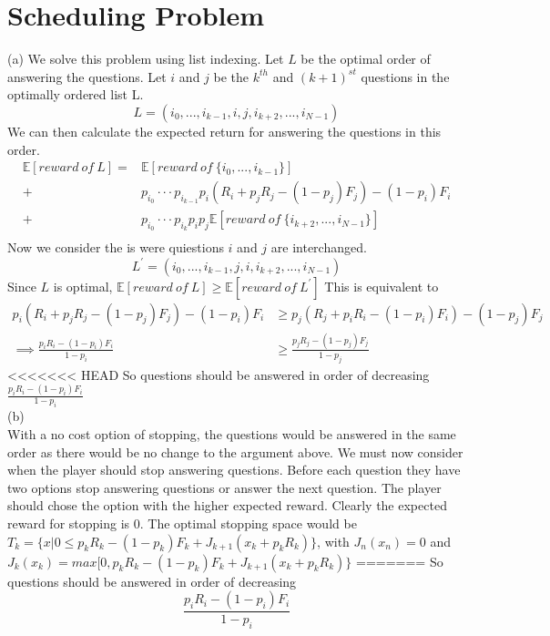 \documentclass[11pt, oneside]{article}   	%
\begin{document}
\section{Scheduling Problem}
(a) We solve this problem using list indexing. Let $L$ be the optimal order of answering the questions. Let $i$ and $j$ be the $k^{th}$ and $(k + 1)^{st}$ questions in the optimally ordered list L.
$$
L = (i_{0},...,i_{k-1},i,j,i_{k+2},...,i_{N-1})
$$
We can then calculate the expected return for answering the questions in this order.
\begin{align*}
\mathbb{E}[{reward~of~L}] = & \mathbb{E} [reward~of~\{i_{0},...,i_{k-1}\}] \\
+ & p_{i_{0}}···p_{i_{k-1}} p_{i}(R_{i}+p_{j}R_{j} -(1-p_{j})F_{j})-(1-p_{i})F_{i}  \\
+ & p_{i_{0}} ···p_{i_{k}} p_{i}p_{j} \mathbb{E}[reward~of~\{i_{k+2},...,i_{N-1}\}] \\
\end{align*}
Now we consider the is were quiestions $i$ and $j$ are interchanged.
$$
L^{\prime} = (i_{0},...,i_{k-1},j,i,i_{k+2},...,i_{N-1})
$$
Since $L$ is optimal, $\mathbb{E}[{reward~of~L}] \geq \mathbb{E}[{reward~of~L^{\prime}}]$
This is equivalent to
\begin{align*}
p_{i}(R_{i}+p_{j}R_{j} -(1-p_{j})F_{j})-(1-p_{i})F_{i} &\geq p_{j}(R_{j}+p_{i}R_{i} -(1-p_{i})F_{i})-(1-p_{j})F_{j} \\
\implies \frac{p_{i}R_{i}-(1-p_{i})F_{i}}{1-p_{i}} &\geq \frac{p_{j}R_{j}-(1-p_{j})F_{j}}{1-p_{j}}
\end{align*}
<<<<<<< HEAD
So questions should be answered in order of decreasing $\frac{p_{i}R_{i}-(1-p_{i})F_{i}}{1-p_{i}}$ \\
(b) \\
With a no cost option of stopping, the questions would be answered in the same order as there would be no change to the argument above. We must now consider when the player should stop answering questions. Before each question they have two options stop answering questions or answer the next question. The player should chose the option with the higher expected reward. Clearly the expected reward for stopping is 0. The optimal stopping space would be $T_{k}=\{x|0 \leq  p_{k}R_{k}-(1-p_{k})F_{k} + J_{k+1}(x_{k}+p_{k}R_{k} ) \}$, with $J_{n}(x_{n})=0$ and $J_{k}(x_{k}) = max[0, p_{k}R_{k}-(1-p_{k})F_{k} + J_{k+1}(x_{k}+p_{k}R_{k} ) \}$
=======
So questions should be answered in order of decreasing $$\frac{p_{i}R_{i}-(1-p_{i})F_{i}}{1-p_{i}}$$ \\
\end{document}
